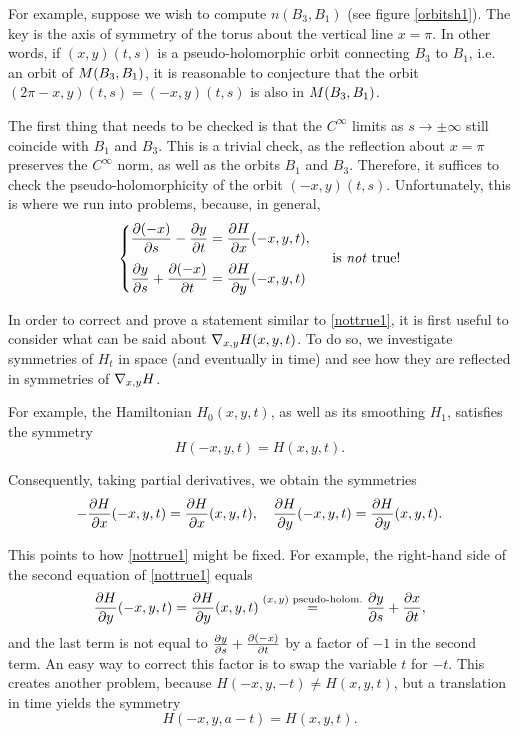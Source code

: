 For example, suppose we wish to compute $n(B_3, B_1)$ (see figure \ref{orbitsh1}). The key is the axis of symmetry of the torus about the vertical line $x = \pi$. In other words, if $(x,y)(t,s)$ is a pseudo-holomorphic orbit connecting $B_3$ to $B_1$, i.e. an orbit of $M(B_3,B_1)$, it is reasonable to conjecture that the orbit $(2\pi-x, y)(t,s) = (-x,y)(t,s)$ is also in $M(B_3,B_1)$.

The first thing that needs to be checked is that the $C^\infty$ limits as $s \to \pm \infty$ still coincide with $B_1$ and $B_3$. This is a trivial check, as the reflection about $x = \pi$ preserves the $C^\infty$ norm, as well as the orbits $B_1$ and $B_3$. Therefore, it suffices to check the pseudo-holomorphicity of the orbit $(-x,y)(t,s)$. Unfortunately, this is where we run into problems, because, in general,
\begin{equation}
\label{nottrue1}
\begin{cases}
\displaystyle \diffp{(-x)} s - \diffp y t = \diffp H x(-x,y,t),\\[1em]
\displaystyle \diffp y s + \diffp{(-x)} t = \diffp H y(-x,y,t)
\end{cases}
\text{ is \emph{not} true!}
\end{equation}

In order to correct and prove a statement similar to \eqref{nottrue1}, it is first useful to consider what can be said about $\nabla_{x,y} H(x,y,t)$. To do so, we investigate symmetries of $H_t$ in space (and eventually in time) and see how they are reflected in symmetries of $\nabla_{x,y} H$.

For example, the Hamiltonian $H_0(x,y,t)$, as well as its smoothing $H_1$, satisfies the symmetry
\begin{equation}
H(-x,y,t) = H(x,y,t).
\end{equation}

Consequently, taking partial derivatives, we obtain the symmetries
\begin{equation}\label{eq:symmetries1}
- \diffp H x(-x,y,t) = \diffp H x(x,y,t),\quad \diffp H y(-x,y,t) = \diffp H y (x,y,t).
\end{equation}

This points to how \eqref{nottrue1} might be fixed. For example, the right-hand side of the second equation of \eqref{nottrue1} equals
\begin{equation}
\diffp H y (-x,y,t) = \diffp H y (x,y,t) \stackrel{\text{$(x,y)$ pseudo-holom.}}{=} \diffp y s + \diffp{x} t,
\end{equation}
and the last term is not equal to $\diffp y s + \diffp{(-x)} t$ by a factor of $-1$ in the second term. An easy way to correct this factor is to swap the variable $t$ for $-t$. This creates another problem, because $H(-x,y,-t) \neq H(x,y,t)$, but a translation in time yields the symmetry
\begin{equation}
H(-x,y,a - t) = H(x,y,t).
\end{equation}

